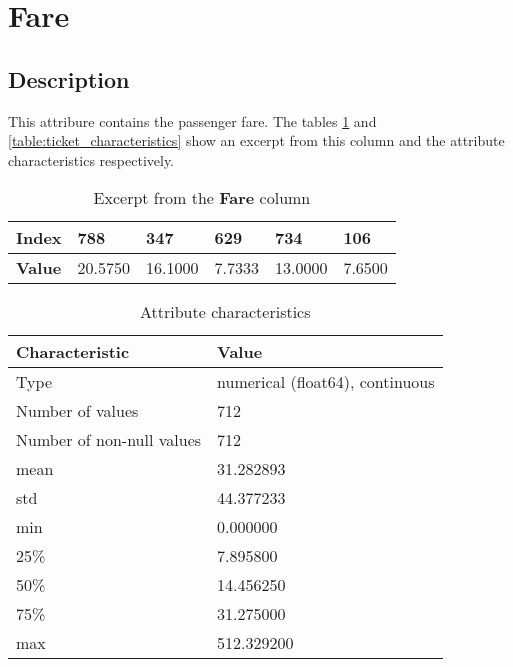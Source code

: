 \section{Fare} \label{section:Fare}
\subsection{Description}
This attribure contains the passenger fare. The tables 
\ref{table:fare_head} and \ref{table:ticket_characteristics} show an 
excerpt from this column and the attribute characteristics respectively.

\begin{table}[!hp]
    \centering
    \caption{Excerpt from the \textbf{Fare} column}
    \begin{tabular}{|l|l|l|l|l|l|}
        \hline
        \textbf{Index} & 788     & 347     & 629    & 734     & 106    \\ \hline
        \textbf{Value} & 20.5750 & 16.1000 & 7.7333 & 13.0000 & 7.6500 \\ \hline
    \end{tabular}
    \label{table:fare_head}
\end{table}

\begin{table}[!hp]
    \centering
    \caption{Attribute characteristics}
    \begin{tabular}{|l|l|}
        \hline
        \textbf{Characteristic}   & \textbf{Value}                  \\ \hline
        Type                      & numerical (float64), continuous \\ \hline
        Number of values          & 712                             \\ \hline
        Number of non-null values & 712                             \\ \hline
        mean                      &  31.282893                      \\ \hline
        std                       &  44.377233                      \\ \hline
        min                       &   0.000000                      \\ \hline
        25\%                      &   7.895800                      \\ \hline
        50\%                      &  14.456250                      \\ \hline
        75\%                      &  31.275000                      \\ \hline
        max                       & 512.329200                      \\ \hline
    \end{tabular}
    \label{table:fare_characteristics}
\end{table}

